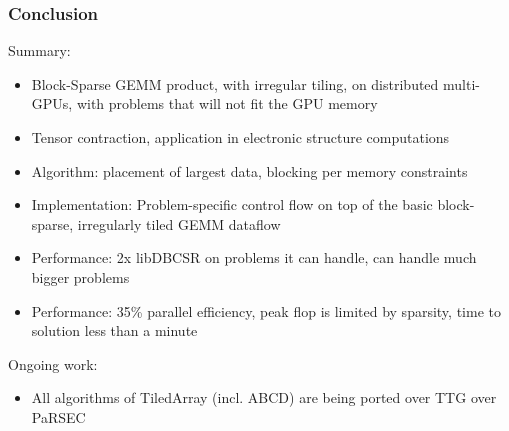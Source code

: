 \begin{frame}
  \frametitle{Conclusion}

  Summary:
  \begin{itemize}
  \item Block-Sparse GEMM product, with irregular tiling, on distributed multi-GPUs, with problems that will not fit the GPU memory
  \item Tensor contraction, application in electronic structure computations
  \item Algorithm: placement of largest data, blocking per memory constraints
  \item Implementation: Problem-specific control flow on top of the basic block-sparse, irregularly tiled GEMM dataflow
  \item Performance: 2x libDBCSR on problems it can handle, can handle much bigger problems
  \item Performance: 35\% parallel efficiency, peak flop is limited by
    sparsity, time to solution less than a minute
  \end{itemize}

  Ongoing work:
  \begin{itemize}
  \item All algorithms of TiledArray (incl. ABCD) are being ported over TTG over PaRSEC
  \end{itemize}
  
\end{frame}

